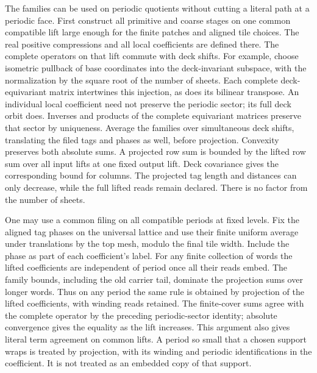 \documentclass[11pt,letterpaper,reqno]{amsart}
\numberwithin{equation}{section}
\theoremstyle{definition}
\theoremstyle{remark}
\begin{document}
The families can be used on periodic quotients without cutting a literal path at a periodic face. First construct all primitive and coarse stages on one common compatible lift large enough for the finite patches and aligned tile choices. The real positive compressions and all local coefficients are defined there. The complete operators on that lift commute with deck shifts. For example, choose isometric pullback of base coordinates into the deck-invariant subspace, with the normalization by the square root of the number of sheets. Each complete deck-equivariant matrix intertwines this injection, as does its bilinear transpose. An individual local coefficient need not preserve the periodic sector; its full deck orbit does. Inverses and products of the complete equivariant matrices preserve that sector by uniqueness. Average the families over simultaneous deck shifts, translating the filed tags and phases as well, before projection. Convexity preserves both absolute sums. A projected row sum is bounded by the lifted row sum over all input lifts at one fixed output lift. Deck covariance gives the corresponding bound for columns. The projected tag length and distances can only decrease, while the full lifted reads remain declared. There is no factor from the number of sheets.

One may use a common filing on all compatible periods at fixed levels. Fix the aligned tag phases on the universal lattice and use their finite uniform average under translations by the top mesh, modulo the final tile width. Include the phase as part of each coefficient's label. For any finite collection of words the lifted coefficients are independent of period once all their reads embed. The family bounds, including the old carrier tail, dominate the projection sums over longer words. Thus on any period the same rule is obtained by projection of the lifted coefficients, with winding reads retained. The finite-cover sums agree with the complete operator by the preceding periodic-sector identity; absolute convergence gives the equality as the lift increases. This argument also gives literal term agreement on common lifts. A period so small that a chosen support wraps is treated by projection, with its winding and periodic identifications in the coefficient. It is not treated as an embedded copy of that support.
\end{document}
